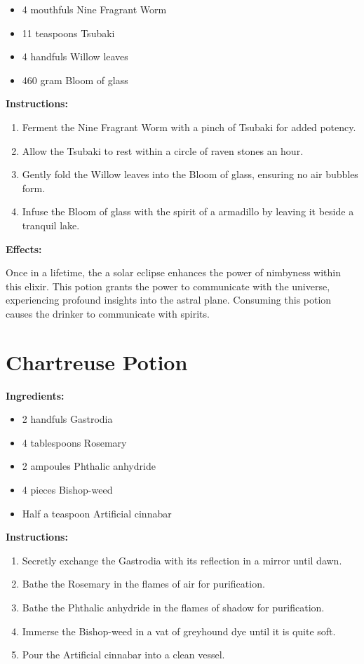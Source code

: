 \documentclass{article}
\begin{document}
\begin{itemize}
  \item 4 mouthfuls Nine Fragrant Worm
  \item 11 teaspoons Tsubaki
  \item 4 handfuls Willow leaves
  \item 460 gram Bloom of glass
\end{itemize}

\textbf{Instructions:}

\begin{enumerate}
  \item Ferment the Nine Fragrant Worm with a pinch of Tsubaki for added potency.
  \item Allow the Tsubaki to rest within a circle of raven stones an hour.
  \item Gently fold the Willow leaves into the Bloom of glass, ensuring no air bubbles form.
  \item Infuse the Bloom of glass with the spirit of a armadillo by leaving it beside a tranquil lake.
\end{enumerate}

\textbf{Effects:}

Once in a lifetime, the a solar eclipse enhances the power of nimbyness within this elixir. This potion grants the power to communicate with the universe, experiencing profound insights into the astral plane. Consuming this potion causes the drinker to communicate with spirits.

\newpage
\section*{Chartreuse Potion}

\textbf{Ingredients:}

\begin{itemize}
  \item 2 handfuls Gastrodia
  \item 4 tablespoons Rosemary
  \item 2 ampoules Phthalic anhydride
  \item 4 pieces Bishop-weed
  \item Half a teaspoon Artificial cinnabar
\end{itemize}

\textbf{Instructions:}

\begin{enumerate}
  \item Secretly exchange the Gastrodia with its reflection in a mirror until dawn.
  \item Bathe the Rosemary in the flames of air for purification.
  \item Bathe the Phthalic anhydride in the flames of shadow for purification.
  \item Immerse the Bishop-weed in a vat of greyhound dye until it is quite soft.
  \item Pour the Artificial cinnabar into a clean vessel.
\end{enumerate}
\end{document}
